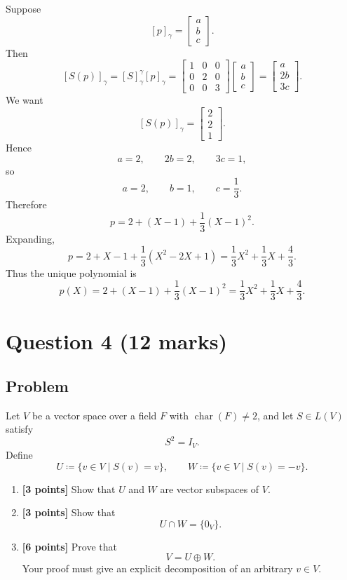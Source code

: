 \documentclass[12pt]{article}
\begin{document}
\begin{enumerate}[label=(\alph*)]
Suppose
\[
[p]_\gamma=\begin{bmatrix}a\\b\\c\end{bmatrix}.
\]
Then
\[
[S(p)]_\gamma=
[S]^\gamma_\gamma [p]_\gamma
=
\begin{bmatrix}
1&0&0\\
0&2&0\\
0&0&3
\end{bmatrix}
\begin{bmatrix}a\\b\\c\end{bmatrix}
=
\begin{bmatrix}a\\2b\\3c\end{bmatrix}.
\]
We want
\[
[S(p)]_\gamma=\begin{bmatrix}2\\2\\1\end{bmatrix}.
\]
Hence
\[
a=2,\qquad 2b=2,\qquad 3c=1,
\]
so
\[
a=2,\qquad b=1,\qquad c=\frac13.
\]
Therefore
\[
p=2+(X-1)+\frac13(X-1)^2.
\]
Expanding,
\[
p
=
2+X-1+\frac13(X^2-2X+1)
=
\frac13X^2+\frac13X+\frac43.
\]
Thus the unique polynomial is
\[
\boxed{
p(X)=2+(X-1)+\frac13(X-1)^2
=
\frac13X^2+\frac13X+\frac43.}
\]
\end{enumerate}

\newpage

\section{Question 4 \hfill (12 marks)}

\subsection{Problem}

Let \(V\) be a vector space over a field \(F\) with \(\operatorname{char}(F)\neq 2\), and let \(S\in L(V)\) satisfy
\[
S^2=I_V.
\]
Define
\[
U\coloneqq \{v\in V\mid S(v)=v\},
\qquad
W\coloneqq \{v\in V\mid S(v)=-v\}.
\]

\begin{enumerate}[label=(\roman*)]
\item \textbf{[3 points]} Show that \(U\) and \(W\) are vector subspaces of \(V\).

\item \textbf{[3 points]} Show that
\[
U\cap W=\{0_V\}.
\]

\item \textbf{[6 points]} Prove that
\[
V=U\oplus W.
\]
Your proof must give an explicit decomposition of an arbitrary \(v\in V\).
\end{enumerate}
\end{document}
